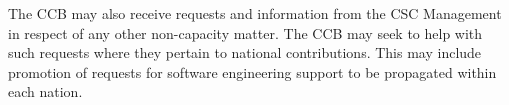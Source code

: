 \documentclass[../main-v1.tex]{subfiles}
\begin{document}
The CCB may also receive requests and information from the CSC Management in respect of any other non-capacity matter. The CCB may seek to help with such requests where they pertain to national contributions. This may include promotion of requests for software engineering support to be propagated within each nation.
\end{document}
